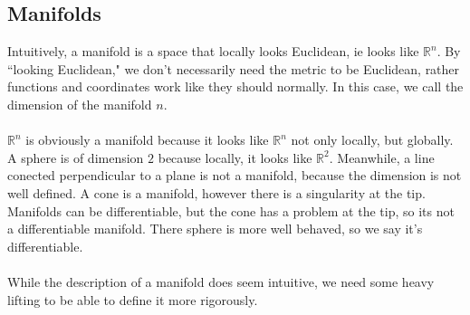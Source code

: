 \documentclass[11pt]{article}
\begin{document}
\subsection{Manifolds}
Intuitively, a manifold is a space that locally looks Euclidean, ie looks like \( \mathbb{R}^{n} \). By ``looking Euclidean," we don't necessarily need the metric to be Euclidean, rather functions and coordinates work like they should normally. In this case, we call the dimension of
the manifold \( n \).
\\
\\
\( \mathbb{R}^{n} \) is obviously a manifold because it looks like \( \mathbb{R}^{n} \) not only locally, but globally. A sphere is of dimension \( 2 \) because locally, it looks like \( \mathbb{R}^{2} \). Meanwhile, a line conected perpendicular to a plane is not a manifold, because the 
dimension is not well defined. A cone is a manifold, however there is a singularity at the tip. Manifolds can be differentiable, but the cone has a problem at the tip, so its not a differentiable manifold. There sphere is more well behaved, so we say it's differentiable.
\\
\\
While the description of a manifold does seem intuitive, we need some heavy lifting to be able to define it more rigorously.
\end{document}
